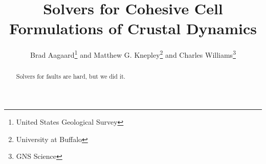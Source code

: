 \documentclass[twoside,leqno,twocolumn]{article}
\begin{document}
%
\newcommand\relatedversion{}
\renewcommand\relatedversion{\thanks{The full version of the paper can be accessed at \anon{\protect\url{redacted-url}}{\protect\url{https://arxiv.org/abs/1902.09310}}}} %

\title{\Large Solvers for Cohesive Cell Formulations of Crustal Dynamics}
{ %
    \author{Brad Aagaard\thanks{United States Geological Survey} and Matthew G. Knepley\thanks{University at Buffalo} and Charles Williams\thanks{GNS Science}}
}

\date{}

\maketitle







\begin{abstract} \small\baselineskip=9pt Solvers for faults are hard, but we did it.
\end{abstract}
\end{document}
